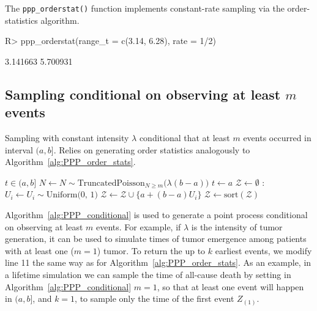 \documentclass[10pt,letterpaper]{article}
\newcommand{\fct}[1]{\texttt{#1()}}
\begin{document}
The \fct{ppp\_orderstat} function implements constant-rate sampling via the order-statistics algorithm.

\begin{Schunk}
\begin{Sinput}
R> ppp_orderstat(range_t = c(3.14, 6.28), rate = 1/2)
\end{Sinput}
\begin{Soutput}
[1] 3.141663 5.700931
\end{Soutput}
\end{Schunk}

\subsection[Sampling conditional on observing at least m events]{Sampling conditional on observing at least $m$ events}\label{sec:PPP_cond_sampling}

\begin{algorithm}[h!]
\caption{Sampling with constant intensity $\lambda$ conditional that at least $m$ events occurred in interval $(a, b]$. Relies on generating order statistics analogously to Algorithm~\ref{alg:PPP_order_stats}.}\label{alg:PPP_conditional}
\begin{algorithmic}[1]
\Require $t \in (a, b]$
\State $N \gets N \sim \textrm{TruncatedPoisson}_{N \ge m}\big(\lambda (b-a)\big)$ 
\State $t \gets a$
\State $\mathcal{Z} \gets \emptyset$ 
    :
        \State $U_i \gets  U_i \sim \textrm{Uniform(0, 1)}$ 
        \State $\mathcal{Z} \gets \mathcal{Z} \cup \{a + (b-a) U_i\} $ 
    \EndFor
    \State $\mathcal{Z} \gets \textrm{sort}(\mathcal{Z})$ 
\EndIf
\State
{} 
\end{algorithmic}
\end{algorithm}


Algorithm~\ref{alg:PPP_conditional} is used to generate a point process conditional on observing at least $m$ events. For example, if $\lambda$ is the intensity of tumor generation, it can be used to simulate times of tumor emergence among patients with at least one ($m=1$) tumor. To return the up to $k$ earliest events, we modify line 11 the same way as for Algorithm~\ref{alg:PPP_order_stats}. As an example, in a lifetime simulation we can sample the time of all-cause death by setting in Algorithm~\ref{alg:PPP_conditional} $m=1$, so that at least one event will happen in $(a, b]$, and $k = 1$, to sample only the time of the first event $Z_{(1)}$.
\end{document}
